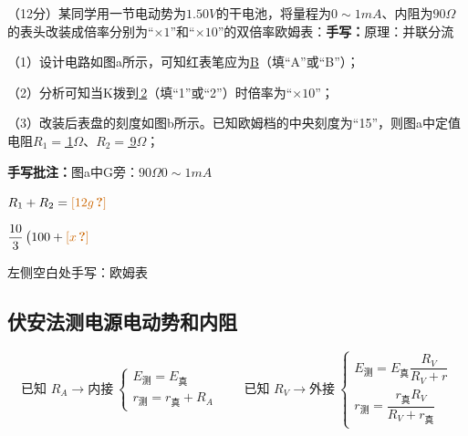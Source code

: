 \begin{problem}[19]
（12分）某同学用一节电动势为$1.50\unit{V}$的干电池，将量程为$0\sim1\unit{mA}$、内阻为$90\unit{\Omega}$的表头改装成倍率分别为“$\times1$”和“$\times10$”的双倍率欧姆表：\quad \textbf{手写：}原理：并联分流%

（1）设计电路如图a所示，可知红表笔应为\underline{\quad B\quad}（填“A”或“B”\unclear{$\checkmark$}）；%

（2）分析可知当K拨到\underline{\quad{}\,2\quad}（填“1”或“2”）时倍率为“$\times10$”；%

（3）改装后表盘的刻度如图b所示。已知欧姆档的中央刻度为“15”，则图a中定值电阻$R_1=$\underline{\quad{}\,1\quad}$\unit{\Omega}$、$R_2=$\underline{\quad{}\,9\quad}$\unit{\Omega}$；%


\end{problem}

\textbf{手写批注：}图a中G旁：$90\unit{\Omega}$\quad $0\sim1\unit{mA}$

$R_1+R_2=\unclear{12g}$

$\dfrac{10}{3}\,\bigl(100+\unclear{x}$%

左侧空白处手写：欧姆表\quad {}

\subsection{伏安法测电源电动势和内阻}
\[
\text{已知 }R_A\to\text{内接}\
\left\{\begin{array}{l} E_{\text{测}}=E_{\text{真}}\\ r_{\text{测}}=r_{\text{真}}+R_A \end{array}\right.
\qquad
\text{已知 }R_V\to\text{外接}\
\left\{\begin{array}{l} E_{\text{测}}=E_{\text{真}}\dfrac{R_V}{R_V+r}\\[8pt] r_{\text{测}}=\dfrac{r_{\text{真}}R_V}{R_V+r_{\text{真}}} \end{array}\right.
\]

